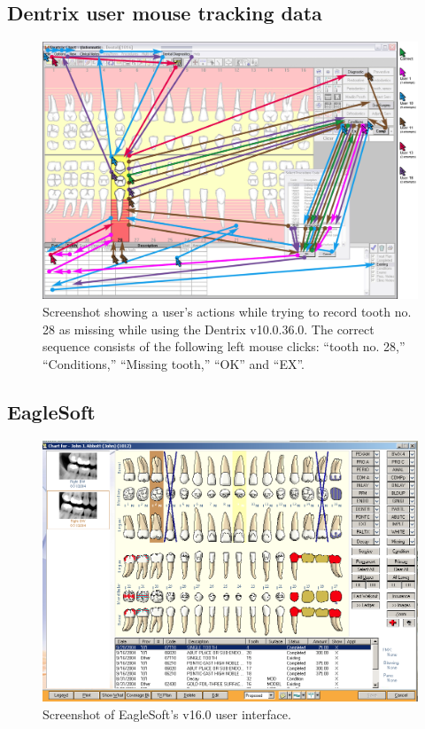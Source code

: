 \documentclass[11pt]{article}
\begin{document}
\subsection{Dentrix user mouse tracking data}
\label{dentrixusabil}
\begin{figure}[h]
\begin{center}
\includegraphics[width=\textwidth]{dentrixuse.png}
\end{center}
\caption{Screenshot showing a user’s actions while trying to record tooth no. 28 as missing while using the Dentrix v10.0.36.0. The correct sequence consists of the following left mouse clicks: “tooth no. 28,” “Conditions,” “Missing tooth,” “OK” and “EX”\cite{Thyvalikakath2008A-usability-eva}.}
\end{figure}

\newpage
\subsection{EagleSoft}
\label{ES}
\begin{figure}[h]
\begin{center}
\includegraphics[width=\textwidth]{esss.png}
\end{center}
\caption{Screenshot of EagleSoft's v16.0 user interface.}
\end{figure}
\end{document}
